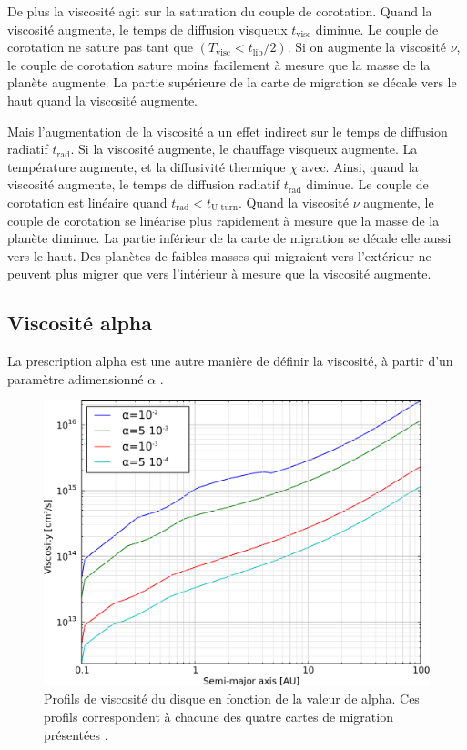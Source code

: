 De plus la viscosité agit sur la saturation du couple de corotation.
Quand la viscosité augmente, le temps de diffusion visqueux $t_\text{visc}$ diminue. Le couple de corotation ne sature pas tant
que $(T_\text{visc} < t_\text{lib}/2)$. Si on augmente la viscosité $\nu$, le couple de corotation sature moins facilement à
mesure que la masse de la planète augmente. La partie supérieure de la carte de migration se décale vers le haut quand la
viscosité augmente. 

Mais l'augmentation de la viscosité a un effet indirect sur le temps de diffusion radiatif $t_\text{rad}$. Si la viscosité augmente, le chauffage visqueux augmente. La température augmente, et la diffusivité thermique $\chi$ avec. Ainsi, quand la viscosité augmente, le temps de diffusion radiatif $t_\text{rad}$ diminue. Le couple de corotation est linéaire quand $t_\text{rad} < t_\text{U-turn}$. Quand la viscosité $\nu$ augmente, le couple de corotation se linéarise plus rapidement à mesure que la masse de la planète diminue. La partie inférieur de la carte de migration se décale elle aussi vers le haut. Des planètes de faibles masses qui migraient vers l'extérieur ne peuvent plus migrer que vers l'intérieur à mesure que la viscosité augmente. 

\subsection{Viscosité alpha}
La prescription alpha \citep{shakura1973black} est une autre manière de définir la viscosité, à partir d'un paramètre adimensionné $\alpha$ .

\begin{figure}[htbp]
\centering
\includegraphics[width=0.6\linewidth]{figure/migration_map/viscosity/alpha_profiles.pdf}
\caption{Profils de viscosité du disque en fonction de la valeur de alpha. Ces profils correspondent à chacune des quatre cartes de migration
présentées \protect{}. }\label{fig:alpha_profiles}
\end{figure}

